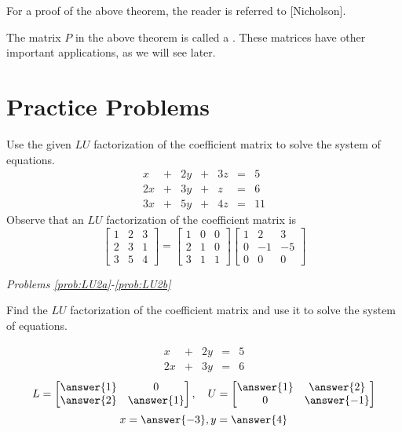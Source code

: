 \documentclass{ximera}
\begin{document}
For a proof of the above theorem, the reader is referred to [Nicholson].

The matrix $P$ in the above theorem is called a .  These matrices have other important applications, as we will see later.


\section*{Practice Problems}

\begin{problem}\label{prob:LU1}
Use the given $LU$ factorization of the coefficient matrix to solve the system of equations.
$$\begin{array}{ccccccc}
      x & +&2y&+&3z&= &5 \\
	 2x&+&3y&+&z&=&6\\
     3x& +&5y&+&4z&=&11
    \end{array}$$
Observe that an $LU$ factorization of the coefficient matrix is
\[
\begin{bmatrix}
1 & 2 & 3 \\
2 & 3 & 1 \\
3 & 5 & 4\end{bmatrix}
=
\begin{bmatrix}
1 & 0 & 0 \\
2 & 1 & 0 \\
3 & 1 & 1
\end{bmatrix} 
\begin{bmatrix}
1 & 2 & 3 \\
0 & -1 & -5 \\
0 & 0 & 0
\end{bmatrix}
\]
\end{problem}

\emph{Problems \ref{prob:LU2a}-\ref{prob:LU2b}}

Find the $LU$ factorization of the coefficient matrix and use it to solve the system of equations.

\begin{problem}\label{prob:LU2a}

$$
\begin{array}{ccccc}
      x& +&2y&=&5\\
      2x & +&3y&= &6 
    \end{array}
$$
$$L=\begin{bmatrix}\answer{1}&0\\\answer{2}&\answer{1}\end{bmatrix},\quad U=\begin{bmatrix}\answer{1}&\answer{2}\\0&\answer{-1}\end{bmatrix}$$
$$x=\answer{-3}, y=\answer{4}$$
\end{problem}
\end{document}
